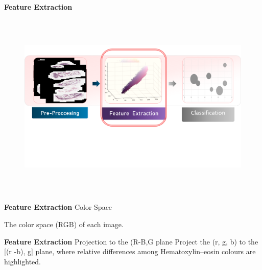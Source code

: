 \documentclass[usenames,dvipsnames]{beamer}
\begin{document}
\begin{frame}{\textbf{Feature Extraction }}

  \vspace{-0.5cm}
\begin{figure}

    \centering
  \includegraphics[height=9cm,width=14cm]{imagenes3/metodologia3.png}
   
\end{figure}
\end{frame}
\begin{frame}{\textbf{Feature Extraction}}  {\large Color Space }

\large The color space (RGB) of  each image.
\\
\centering
\vspace{2mm} 
    
\end{frame}
\begin{frame}{\textbf{Feature Extraction}} {\large Projection to the (R-B,G plane}
Project the (r, g, b)  to the [(r -b), g] plane, where relative differences
among Hematoxylin–eosin colours are highlighted.
\\
\centering
\vspace{2mm} 
   
\end{frame}
\end{document}
